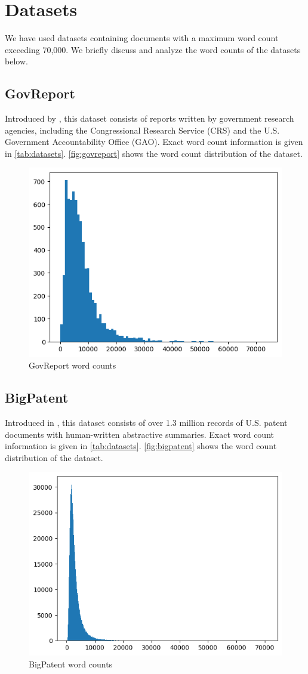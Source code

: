 \section{Datasets}
	\label{sec:datasets}

	We have used datasets containing documents with a maximum word count exceeding 70,000.
	We briefly discuss and analyze the word counts of the datasets below.


\subsection*{GovReport}

	Introduced by \citet{huang-etal-2021-efficient}, this dataset consists of reports written
	by government research agencies, including the Congressional Research Service (CRS) and
	the U.S. Government Accountability Office (GAO).
	Exact word count information is given in \autoref{tab:datasets}.
	\autoref{fig:govreport} shows the word count distribution of the dataset.

	\begin{figure}[!ht]
		\centering
		\includegraphics[width=.48\textwidth]{Images/govreport-wordcount.png}
		\caption{GovReport word counts}
		\label{fig:govreport}
	\end{figure}


\subsection*{BigPatent}

	Introduced in \citet{sharma-etal-2019-bigpatent}, this dataset consists of over 1.3 million
	records of U.S. patent documents with human-written abstractive summaries.
	Exact word count information is given in \autoref{tab:datasets}.
	\autoref{fig:bigpatent} shows the word count distribution of the dataset.

	\begin{figure}[!ht]
		\centering
		\includegraphics[width=.48\textwidth]{Images/bigpatent-wordcount.png}
		\caption{BigPatent word counts}
		\label{fig:bigpatent}
	\end{figure}

